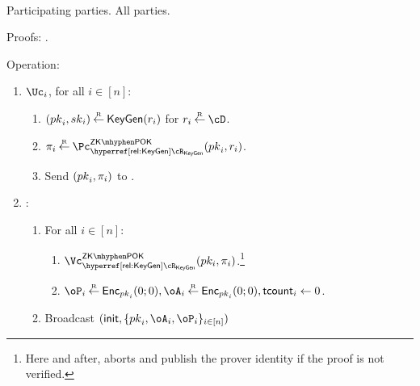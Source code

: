 \begin{protocol}~\label{prot:ConfidentialTransactions:Init}
	

	\item[Participating parties.] All parties.
			
			
	\item[Proofs:]   \piZKPOK{\rKeyGen}. 
	
	
			
\item[Operation:] ~
			
			
			\begin{enumerate}
				
				\item   $\Uc_i$, for  all $i\in [n]$:
				\begin{enumerate}
					\item  $({pk}_i,{sk}_i) \mathbin{\stackrel{\mbox{\tiny R}}{\leftarrow}} \mathsf{KeyGen}(r_i)$ for $r_i \getsr \cD$.
					
					
					\item  $\pi_i \getsr \pZKPOK{\rKeyGen}(\pk_i,r_i)$.  
					
					\item Send $({pk}_i,\pi_i)$ to \Cc.
					
					
				\end{enumerate}
				
				\item \Cc: ~
				
				\begin{enumerate}
				
				\item For all $i\in [n]$: 
				
				\begin{enumerate}
					\item 	 $\vZKPOK{\rKeyGen}(pk_i,\pi_i)$.\footnote{Here and after,  \Cc aborts and publish the prover identity if the   proof is not verified.}
					
					\item $\oP_i\getsr \Enc_{\pk_i}(0;0),\oA_i\getsr \Enc_{\pk_i}(0;0),\tcount_i 
					\asn 0$. 
					
			
				\end{enumerate}
			
		\item Broadcast $(\init,\sset{\pk_i,\oA_i,\oP_i}_{i\in [n]})$
				\end{enumerate}								
			\end{enumerate}
\end{protocol}

